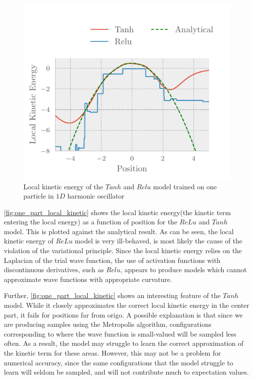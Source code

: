 \begin{figure}[H]
	\includegraphics[]{figures/one_part_local_kinetic.pdf}
	\caption{Local kinetic energy of the $Tanh$ and $Relu$ model trained on one particle in $1D$ harmonic oscillator}
	\label{fig:one_part_local_kinetic}
\end{figure} 

\autoref{fig:one_part_local_kinetic} shows the local kinetic energy(the kinetic term entering the local energy) as a function of position for the $ReLu$ and $Tanh$ model. This is plotted against the analytical result. As can be seen, the local kinetic energy of $ReLu$ model is very ill-behaved, is most likely the cause of the violation of the variational principle. Since the local kinetic energy relies on the Laplacian of the trial wave function, the use of activation functions with discontinuous derivatives, such as $Relu$, appears to produce models which cannot approximate wave functions with appropriate curvature.

Further, \autoref{fig:one_part_local_kinetic} shows an interesting feature of the $Tanh$ model. While it closely approximates the correct local kinetic energy in the center part, it fails for positions far from origo. A possible explanation is that since we are producing samples using the Metropolis algorithm, configurations corresponding to where the wave function is small-valued will be sampled less often. As a result, the model may struggle to learn the correct approximation of the kinetic term for these areas. However, this may not be a problem for numerical accuracy, since the same configurations that the model struggle to learn will seldom be sampled, and will not contribute much to expectation values.  

